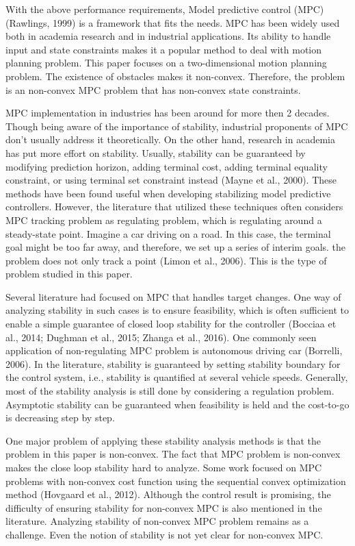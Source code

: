 With the above performance requirements, Model predictive control (MPC) (Rawlings, 1999) is a framework that fits the needs. MPC has been widely used both in academia research and in industrial applications. Its ability to handle input and state constraints makes it a popular method to deal with motion planning problem. 
This paper focuses on a two-dimensional motion planning problem. %
The existence of obstacles makes it non-convex. Therefore, the problem is an non-convex MPC problem that has non-convex state constraints. 

MPC implementation in industries has been around for more then 2 decades. Though being aware of the importance of stability, industrial proponents of MPC don't usually address it theoretically. On the other hand, research in academia has put more effort on stability. Usually, stability can be guaranteed by modifying prediction horizon, adding terminal cost, adding terminal equality constraint, or using terminal set constraint instead (Mayne et al., 2000). These methods have been found useful when developing stabilizing model predictive controllers. However, the literature that utilized these techniques often considers MPC tracking problem as regulating problem, which is regulating around a steady-state point. Imagine a car driving on a road. In this case, the terminal goal might be too far away, and therefore, we set up a series of interim goals. the problem does not only track a point (Limon et al., 2006). This is the type of problem studied in this paper.

Several literature had focused on MPC that handles target changes. One way of analyzing stability in such cases is to ensure feasibility, which is often sufficient to enable a simple guarantee of closed loop stability for the controller (Bocciaa et al., 2014; Dughman et al., 2015; Zhanga et al., 2016). One commonly seen application of non-regulating MPC problem is autonomous driving car (Borrelli, 2006). In the literature, stability is guaranteed by setting stability boundary for the control system, i.e., stability is quantified at several vehicle speeds. Generally, most of the stability analysis is still done by considering a regulation problem. Asymptotic stability can be guaranteed when feasibility is held and the cost-to-go is decreasing step by step.

One major problem of applying these stability analysis methods is that the problem in this paper is non-convex. The fact that MPC problem is non-convex makes the close loop stability hard to analyze. Some work focused on MPC problems with non-convex cost function using the sequential convex optimization method (Hovgaard et al., 2012). Although the control result is promising, the difficulty of ensuring stability for non-convex MPC is also mentioned in the literature. 
Analyzing stability of non-convex MPC problem remains as a challenge. Even the notion of stability is not yet clear for non-convex MPC.

